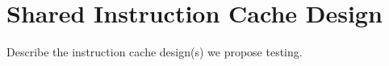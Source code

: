 \section{Shared Instruction Cache Design}

Describe the instruction cache design(s) we propose testing.


